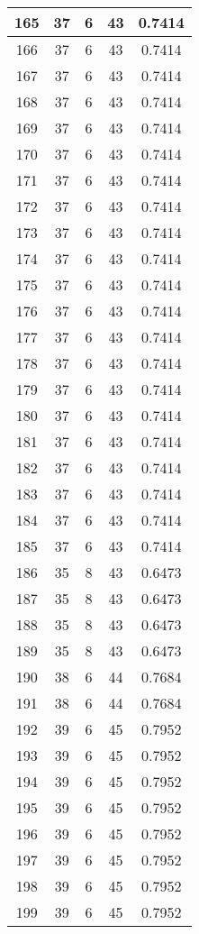 \documentclass[letterpaper, 12pt]{article}
\begin{document}
\begin{longtable}{|c|c|c|c|c|}
\hline
165 & 37 & 6 & 43 & 0.7414 \\
\hline
166 & 37 & 6 & 43 & 0.7414 \\
\hline
167 & 37 & 6 & 43 & 0.7414 \\
\hline
168 & 37 & 6 & 43 & 0.7414 \\
\hline
169 & 37 & 6 & 43 & 0.7414 \\
\hline
170 & 37 & 6 & 43 & 0.7414 \\
\hline
171 & 37 & 6 & 43 & 0.7414 \\
\hline
172 & 37 & 6 & 43 & 0.7414 \\
\hline
173 & 37 & 6 & 43 & 0.7414 \\
\hline
174 & 37 & 6 & 43 & 0.7414 \\
\hline
175 & 37 & 6 & 43 & 0.7414 \\
\hline
176 & 37 & 6 & 43 & 0.7414 \\
\hline
177 & 37 & 6 & 43 & 0.7414 \\
\hline
178 & 37 & 6 & 43 & 0.7414 \\
\hline
179 & 37 & 6 & 43 & 0.7414 \\
\hline
180 & 37 & 6 & 43 & 0.7414 \\
\hline
181 & 37 & 6 & 43 & 0.7414 \\
\hline
182 & 37 & 6 & 43 & 0.7414 \\
\hline
183 & 37 & 6 & 43 & 0.7414 \\
\hline
184 & 37 & 6 & 43 & 0.7414 \\
\hline
185 & 37 & 6 & 43 & 0.7414 \\
\hline
186 & 35 & 8 & 43 & 0.6473 \\
\hline
187 & 35 & 8 & 43 & 0.6473 \\
\hline
188 & 35 & 8 & 43 & 0.6473 \\
\hline
189 & 35 & 8 & 43 & 0.6473 \\
\hline
190 & 38 & 6 & 44 & 0.7684 \\
\hline
191 & 38 & 6 & 44 & 0.7684 \\
\hline
192 & 39 & 6 & 45 & 0.7952 \\
\hline
193 & 39 & 6 & 45 & 0.7952 \\
\hline
194 & 39 & 6 & 45 & 0.7952 \\
\hline
195 & 39 & 6 & 45 & 0.7952 \\
\hline
196 & 39 & 6 & 45 & 0.7952 \\
\hline
197 & 39 & 6 & 45 & 0.7952 \\
\hline
198 & 39 & 6 & 45 & 0.7952 \\
\hline
199 & 39 & 6 & 45 & 0.7952 \\
\hline
\end{longtable}
\end{document}
